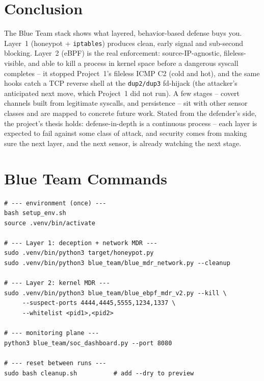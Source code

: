\documentclass[11pt]{article}
\newcommand{\co}[1]{\texttt{#1}}
\begin{document}
\section{Conclusion}
The Blue Team stack shows what layered, behavior-based defense buys you.
Layer~1 (honeypot + \co{iptables}) produces clean, early signal and
sub-second blocking. Layer~2 (eBPF) is the real enforcement:
source-IP-agnostic, fileless-visible, and able to kill a process in kernel
space before a dangerous syscall completes -- it stopped Project~1's fileless
ICMP C2 (cold and hot), and the same hooks catch a TCP reverse shell at the
\co{dup2/dup3} fd-hijack (the attacker's anticipated next move, which
Project~1 did not run). A few stages -- covert channels built from legitimate
syscalls, and persistence -- sit with other sensor classes and are mapped to
concrete future work. Stated from the defender's side, the project's thesis
holds: defense-in-depth is a continuous process -- each layer is expected to
fail against some class of attack, and security comes from making sure the
next layer, and the next sensor, is already watching the next stage.

\appendix
\section{Blue Team Commands}
\begin{lstlisting}
# --- environment (once) ---
bash setup_env.sh
source .venv/bin/activate

# --- Layer 1: deception + network MDR ---
sudo .venv/bin/python3 target/honeypot.py
sudo .venv/bin/python3 blue_team/blue_mdr_network.py --cleanup

# --- Layer 2: kernel MDR ---
sudo .venv/bin/python3 blue_team/blue_ebpf_mdr_v2.py --kill \
     --suspect-ports 4444,4445,5555,1234,1337 \
     --whitelist <pid1>,<pid2>

# --- monitoring plane ---
python3 blue_team/soc_dashboard.py --port 8080

# --- reset between runs ---
sudo bash cleanup.sh          # add --dry to preview
\end{lstlisting}
\end{document}
